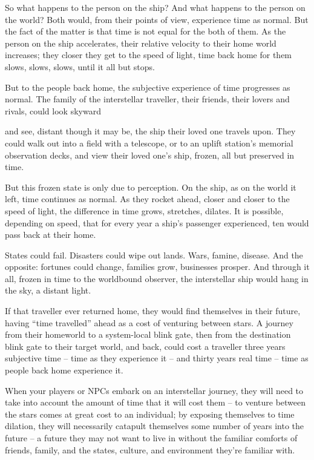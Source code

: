 So what happens to the person on the ship? And what happens to the person on the world?
Both would, from their points of view, experience time as normal. But the fact of the matter
is that time is not equal for the both of them. As the person on the ship accelerates, their
relative velocity to their home world increases; they closer they get to the speed of light,
time back home for them slows, slows, slows, until it all but stops.

But to the people back home, the subjective experience of time progresses as normal. The
family of the interstellar traveller, their friends, their lovers and rivals, could look skyward




and see, distant though it may be, the ship their loved one travels upon. They could walk
out into a field with a telescope, or to an uplift station’s memorial observation decks, and
view their loved one’s ship, frozen, all but preserved in time.

But this frozen state is only due to perception. On the ship, as on the world it left, time
continues as normal. As they rocket ahead, closer and closer to the speed of light, the
difference in time grows, stretches, dilates. It is possible, depending on speed, that for
every year a ship’s passenger experienced, ten would pass back at their home.

States could fail. Disasters could wipe out lands. Wars, famine, disease. And the opposite:
fortunes could change, families grow, businesses prosper. And through it all, frozen in time
to the worldbound observer, the interstellar ship would hang in the sky, a distant light.

If that traveller ever returned home, they would find themselves in their future, having “time
travelled” ahead as a cost of venturing between stars. A journey from their homeworld to a
system-local blink gate, then from the destination blink gate to their target world, and back,
could cost a traveller three years subjective time -- time as they experience it -- and thirty
years real time -- time as people back home experience it.

When your players or NPCs embark on an interstellar journey, they will need to take into account
the amount of time that it will cost them -- to venture between the stars comes at great cost to an
individual; by exposing themselves to time dilation, they will necessarily catapult themselves some
number of years into the future -- a future they may not want to live in without the familiar comforts
of friends, family, and the states, culture, and environment they’re familiar with.

